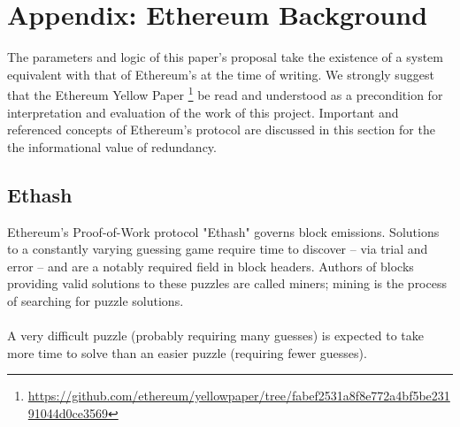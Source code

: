 \documentclass[11pt]{article}
\begin{document}

	\pagebreak
	\section{\normalsize{Appendix: Ethereum Background}}\label{sec: appendix}

	The parameters and logic of this paper's proposal take the existence of a
	system equivalent with that of Ethereum's at the time of writing.
	We strongly suggest that the Ethereum Yellow Paper\nolinebreak
	\footnote{\url{https://github.com/ethereum/yellowpaper/tree/fabef2531a8f8e772a4bf5be23191044d0ce3569}}
	be read and understood as a precondition for interpretation and evaluation
	of the work of this project.
	Important and referenced concepts of Ethereum's protocol are discussed in this
	section for the the informational value of redundancy.

	\subsection{\small{Ethash}}

	Ethereum's Proof-of-Work protocol "Ethash" governs block emissions. Solutions
	to a constantly varying guessing game require time to discover -- via trial and
	error -- and are a notably required field in block headers. Authors of blocks
	providing valid solutions to these puzzles are called miners; mining is the
	process of searching for puzzle solutions. \\
	\\
	A very difficult puzzle (probably requiring many guesses) is expected to take
	more time to solve than an easier puzzle (requiring fewer guesses).
\end{document}
